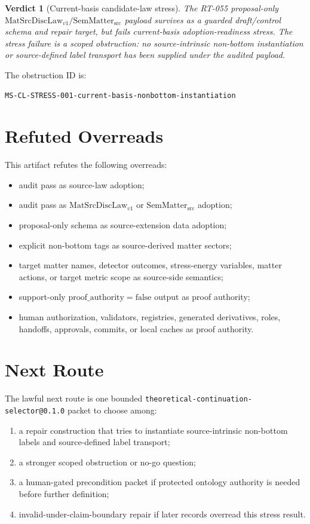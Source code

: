 \documentclass[11pt]{article}
\newcommand{\MatSrcDiscLaw}{\mathrm{MatSrcDiscLaw}_{v1}}
\newcommand{\SemMatterSrc}{\mathrm{SemMatter}_{\mathrm{src}}}
\newcommand{\ProofAuthFalse}{\mathrm{proof\_authority=false}}
\newtheorem{verdict}{Verdict}
\begin{document}
\begin{verdict}[Current-basis candidate-law stress]
The RT-055 proposal-only \(\MatSrcDiscLaw / \SemMatterSrc\) payload survives
as a guarded draft/control schema and repair target, but fails current-basis
adoption-readiness stress. The stress failure is a scoped obstruction:
no source-intrinsic non-bottom instantiation or source-defined label transport
has been supplied under the audited payload.
\end{verdict}

The obstruction ID is:

\begin{verbatim}
MS-CL-STRESS-001-current-basis-nonbottom-instantiation
\end{verbatim}

\section{Refuted Overreads}

This artifact refutes the following overreads:

\begin{itemize}[leftmargin=*]
\item audit pass as source-law adoption;
\item audit pass as \(\MatSrcDiscLaw\) or \(\SemMatterSrc\) adoption;
\item proposal-only schema as source-extension data adoption;
\item explicit non-bottom tags as source-derived matter sectors;
\item target matter names, detector outcomes, stress-energy variables, matter
  actions, or target metric scope as source-side semantics;
\item support-only \(\ProofAuthFalse\) output as proof authority;
\item human authorization, validators, registries, generated derivatives,
  roles, handoffs, approvals, commits, or local caches as proof authority.
\end{itemize}

\section{Next Route}

The lawful next route is one bounded
\texttt{theoretical-continuation-selector@0.1.0} packet to choose among:

\begin{enumerate}[leftmargin=*]
\item a repair construction that tries to instantiate source-intrinsic
  non-bottom labels and source-defined label transport;
\item a stronger scoped obstruction or no-go question;
\item a human-gated precondition packet if protected ontology authority is
  needed before further definition;
\item invalid-under-claim-boundary repair if later records overread this
  stress result.
\end{enumerate}
\end{document}
